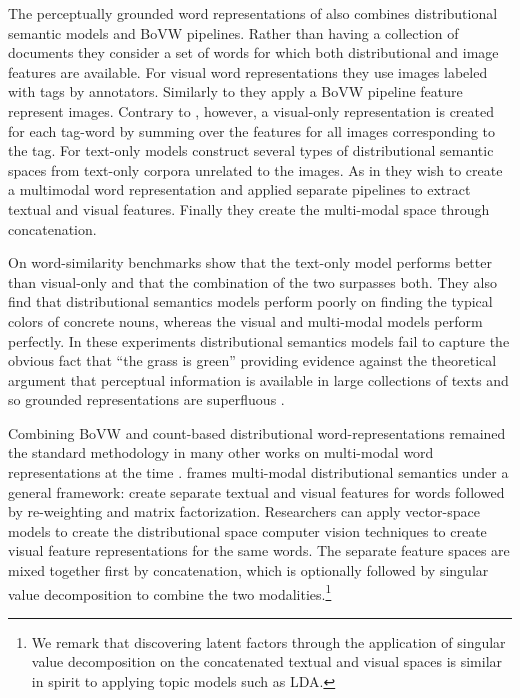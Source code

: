 The perceptually grounded word representations of \cite{bruni2012distributional}
also combines distributional semantic models and BoVW pipelines.
Rather than having a collection of documents they consider a set of words for which
both distributional and image features are available. For visual word representations
they use images labeled with tags by annotators. Similarly to \cite{feng2010visual} they
apply a BoVW pipeline feature represent images. Contrary to \cite{feng2010visual}, however,
a visual-only representation is created for each tag-word by summing over the features
for all images corresponding to the tag.
For text-only models \cite{bruni2012distributional}construct several types of distributional semantic spaces
from text-only corpora unrelated to the images.
As in \cite{feng2010visual} they wish to create a multimodal
word representation and applied separate pipelines to extract textual and visual
features. Finally they create the multi-modal space through concatenation.

On word-similarity benchmarks \cite{bruni2012distributional} show that the text-only model performs better than visual-only
and that the combination of the two surpasses both.
They also find that distributional semantics
models perform poorly on finding the typical colors of concrete nouns,
whereas the visual and multi-modal models perform perfectly. In these experiments
distributional semantics models fail to capture the obvious fact that ``the grass is green''
providing evidence against the theoretical argument that perceptual information is available in
large collections of texts and so grounded representations are superfluous \citep{louwerse2011symbol}.

Combining BoVW and count-based distributional word-representations remained the standard methodology
in many other works on multi-modal word representations at the time
\citep{bruni2011distributional,leong2011going,leong2011measuring}.
\cite{bruni2014multimodal} frames multi-modal distributional semantics under a general framework:
create separate textual and visual features for words followed by
re-weighting and matrix factorization. Researchers can apply vector-space
models to create the distributional space computer vision techniques to create
visual feature representations for the same words. The separate feature spaces
are mixed together  first  by concatenation, which is
optionally followed by singular value decomposition
to combine the two modalities.\footnote{We remark that discovering latent factors through the application
of singular value decomposition on the concatenated textual and visual spaces is similar in spirit
to applying topic models such as LDA.}

